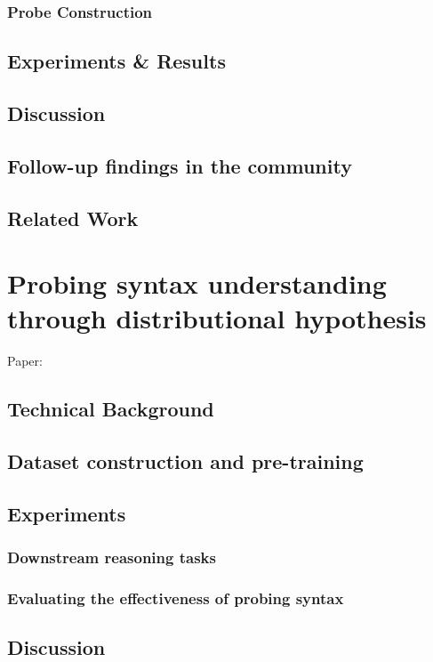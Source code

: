 \documentclass[letterpaper, 12pt]{report}
\begin{document}
\section{Probe Construction}
\label{sec:org0b6937c}
\chapter{Experiments \& Results}
\label{sec:org50de332}
\chapter{Discussion}
\label{sec:org6dbee37}
\chapter{Follow-up findings in the community}
\label{sec:org63e0600}
\chapter{Related Work}
\label{sec:org563142f}
\clearpage
\part{Probing syntax understanding through distributional hypothesis}
\label{sec:org0e2525d}

Paper: \cite{sinha2021}

\chapter{Technical Background}
\label{sec:org1c48b12}
\chapter{Dataset construction and pre-training}
\label{sec:org6fccae9}
\chapter{Experiments}
\label{sec:org128fd02}
\section{Downstream reasoning tasks}
\label{sec:org8fc623c}
\section{Evaluating the effectiveness of probing syntax}
\label{sec:org28dddc0}
\chapter{Discussion}
\label{sec:org5425dc6}
\end{document}
